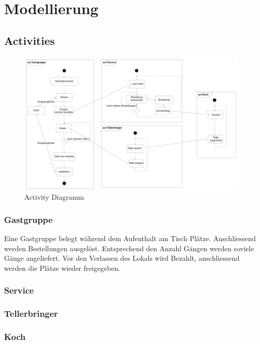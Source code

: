 \documentclass[ngerman,a4paper,12pt]{scrreprt}
\begin{document}
\chapter{Modellierung}
	\section{Activities}
		\begin{figure}[H]
			\centering
				\includegraphics[width=1\textwidth]{img/activityDiagramm-v1.png}
				\caption[Activity Diagramm]{Activity Diagramm}
				\label{activityDiagramm}
		\end{figure}
		
		\subsection{Gastgruppe}
		Eine Gastgruppe belegt während dem Aufenthalt am Tisch Plätze. Anschliessend werden Bestellungen ausgelöst.
		Entsprechend den Anzahl Gängen werden soviele Gänge angeliefert.
		Vor den Verlassen des Lokals wird Bezahlt, anschliessend werden die Plätze wieder freigegeben.
		
		\subsection{Service}
		
		
		\subsection{Tellerbringer}
		
		\subsection{Koch}
		
\end{document}
